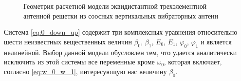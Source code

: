 \documentclass[../main.tex]{subfiles}
\begin{document}
\begin{figure}[htbp]
  \begin{center}


  \caption{Геометрия расчетной модели эквидистантной трехэлементной антенной решетки из соосных вертикальных вибраторных антенн}
  \label{figure:surface:pic1}
  \end{center}
\end{figure}

Система \eqref{eq:0_down_up} содержит три комплексных уравнения относительно шести неизвестных вещественных величин $\beta_0$, $\beta_1$, $E_0$, $E_1$, $\varphi_0$, $\varphi_1$ и является нелинейной. Выбор данной модели обусловлен тем, что удается аналитически исключить из этой системы все переменные кроме $\omega_0$, которая включает, согласно \eqref{eq:w_0_w_1}, интересующую нас величину $\beta_0$.
\end{document}
